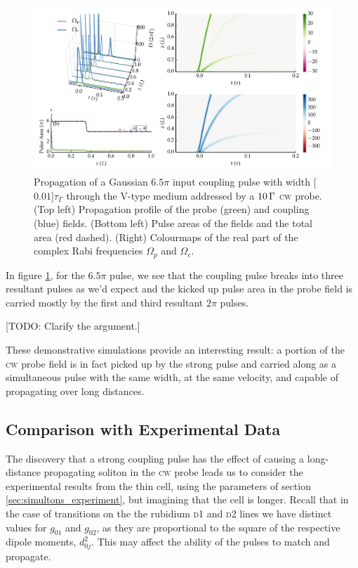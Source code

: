     \begin{figure}%
    \includegraphics[width=\linewidth]{figs/06_simultons/mb_vee_sit_plot_65pi_Ng1e4_fig1.pdf}
    \caption{
    Propagation of a Gaussian $6.5 \pi$ input coupling pulse with width
    \unit[$0.01$]{$\tau_\Gamma$} through the V-type medium addressed by a
    $\unit[10]{\Gamma}$ \textsc{cw} probe. (Top left) Propagation profile of the
    probe (green) and coupling (blue) fields. (Bottom left) Pulse areas of the
    fields and the total area (red dashed). (Right) Colourmaps of the real part
    of the complex Rabi frequencies $\Omega_{p}$ and $\Omega_{c}$.
    }
    \label{fig:pulse_cw_6pi_cmap}
    \end{figure}

    In figure \ref{fig:pulse_cw_6pi_cmap}, for the $6.5 \pi$ pulse, we see that the coupling pulse breaks into three resultant pulses as we'd expect and the kicked up pulse area in the probe field is carried mostly by the first and third resultant $2 \pi$ pulses.

    [TODO: Clarify the argument.]

    These demonstrative simulations provide an interesting result: a portion of
    the \textsc{cw} probe field is in fact picked up by the strong pulse and
    carried along as a simultaneous pulse with the same width, at the same
    velocity, and capable of propagating over long distances.

  \subsection{Comparison with Experimental Data}

    The discovery that a strong coupling pulse has the effect of causing a long-
    distance propagating soliton in the \textsc{cw} probe leads us to consider
    the experimental results from the thin cell, using the parameters of section
    \ref{sec:simultons_experiment}, but imagining that the cell is longer.
    Recall that in the case of transitions on the the rubidium \textsc{d1} and
    \textsc{d2} lines we have distinct values for $g_{01}$ and $g_{02}$, as they
    are proportional to the square of the respective dipole moments, $d_{0j}^2$.
    This may affect the ability of the pulses to match and propagate.

